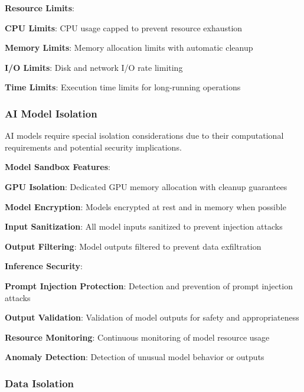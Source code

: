 \textbf{Resource Limits}:
\begin{compactlist}
    \item \textbf{CPU Limits}: CPU usage capped to prevent resource exhaustion
    \item \textbf{Memory Limits}: Memory allocation limits with automatic cleanup
    \item \textbf{I/O Limits}: Disk and network I/O rate limiting
    \item \textbf{Time Limits}: Execution time limits for long-running operations
\end{compactlist}

\subsubsection*{AI Model Isolation}

AI models require special isolation considerations due to their computational requirements and potential security implications.

\textbf{Model Sandbox Features}:
\begin{compactlist}
    \item \textbf{GPU Isolation}: Dedicated GPU memory allocation with cleanup guarantees
    \item \textbf{Model Encryption}: Models encrypted at rest and in memory when possible
    \item \textbf{Input Sanitization}: All model inputs sanitized to prevent injection attacks
    \item \textbf{Output Filtering}: Model outputs filtered to prevent data exfiltration
\end{compactlist}

\textbf{Inference Security}:
\begin{compactlist}
    \item \textbf{Prompt Injection Protection}: Detection and prevention of prompt injection attacks
    \item \textbf{Output Validation}: Validation of model outputs for safety and appropriateness
    \item \textbf{Resource Monitoring}: Continuous monitoring of model resource usage
    \item \textbf{Anomaly Detection}: Detection of unusual model behavior or outputs
\end{compactlist}

\subsubsection*{Data Isolation}

